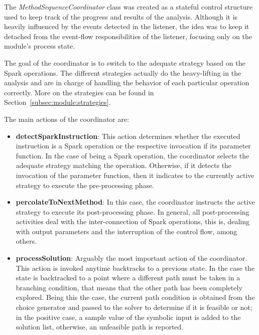 
The \textit{MethodSequenceCoordinator} class was created as a stateful control structure used to keep track of the progress and results of the analysis. Although it is heavily influenced by the events detected in the listener, the idea was to keep it detached from the event-flow responsibilities of the listener, focusing only on the module's process state.

The goal of the coordinator is to switch to the adequate strategy based on the Spark operations. The different strategies actually do the heavy-lifting in the analysis and are in charge of handling the behavior of each particular operation correctly. More on the strategies can be found in Section~\ref{subsec:module:strategies}.

The main actions of the coordinator are:

\begin{itemize}
	\item \textbf{detectSparkInstruction}: This action determines whether the executed instruction is a Spark operation or the respective invocation if its parameter function. In the case of being a Spark operation, the coordinator selects the adequate strategy matching the operation. Otherwise, if it detects the invocation of the parameter function, then it indicates to the currently active strategy to execute the pre-processing phase.
	\item \textbf{percolateToNextMethod}: In this case, the coordinator instructs the active strategy to execute its post-processing phase. In general, all post-processing activities deal with the inter-connection of Spark operations, this is, dealing with output parameters and the interruption of the control flow, among others.
	\item \textbf{processSolution}: Arguably the most important action of the coordinator. This action is invoked anytime \jpf{} backtracks to a previous state. In the case the state is backtracked to a point where a different path must be taken in a branching condition, that means that the other path has been completely explored. Being this the case, the current path condition is obtained from the choice generator and passed to the solver to determine if it is feasible or not; in the positive case, a sample value of the symbolic input is added to the solution list, otherwise, an unfeasible path is reported.
\end{itemize}

